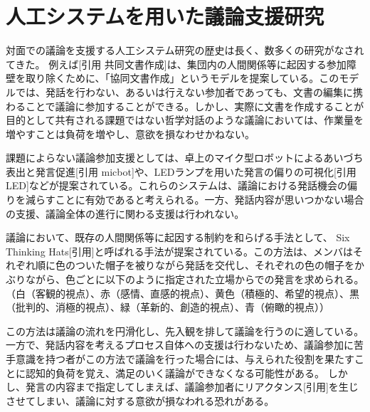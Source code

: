 \documentclass[11pt, a4paper]{jreport} %
\begin{document}
\section{人工システムを用いた議論支援研究}

対面での議論を支援する人工システム研究の歴史は長く、数多くの研究がなされてきた。
例えば[引用 共同文書作成]は、集団内の人間関係等に起因する参加障壁を取り除くために、「協同文書作成」というモデルを提案している。このモデルでは、発話を行わない、あるいは行えない参加者であっても、文書の編集に携わることで議論に参加することができる。しかし、実際に文書を作成することが目的として共有される課題ではない哲学対話のような議論においては、作業量を増やすことは負荷を増やし、意欲を損なわせかねない。


課題によらない議論参加支援としては、卓上のマイク型ロボットによるあいづち表出と発言促進[引用 micbot]や、LEDランプを用いた発言の偏りの可視化[引用 LED]などが提案されている。これらのシステムは、議論における発話機会の偏りを減らすことに有効であると考えられる。一方、発話内容が思いつかない場合の支援、議論全体の進行に関わる支援は行われない。


議論において、既存の人間関係等に起因する制約を和らげる手法として、
Six Thinking Hats[引用]と呼ばれる手法が提案されている。この方法は、メンバはそれぞれ順に色のついた帽子を被りながら発話を交代し、それぞれの色の帽子をかぶりながら、色ごとに以下のように指定された立場からでの発言を求められる。
（白（客観的視点）、赤（感情、直感的視点）、黄色（積極的、希望的視点）、黒（批判的、消極的視点）、緑（革新的、創造的視点）、青（俯瞰的視点））

この方法は議論の流れを円滑化し、先入観を排して議論を行うのに適している。一方で、発話内容を考えるプロセス自体への支援は行わないため、議論参加に苦手意識を持つ者がこの方法で議論を行った場合には、与えられた役割を果たすことに認知的負荷を覚え、満足のいく議論ができなくなる可能性がある。
しかし、発言の内容まで指定してしまえば、議論参加者にリアクタンス[引用]を生じさせてしまい、議論に対する意欲が損なわれる恐れがある。
\end{document}
